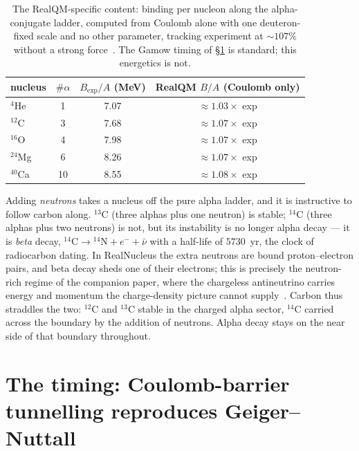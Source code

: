 \documentclass[11pt]{article}
\begin{document}
\begin{table}[h]
\centering
\begin{tabular}{lccc}
\hline
nucleus & $\#\alpha$ & $B_{\exp}/A$ (MeV) & RealQM $B/A$ (Coulomb only) \\
\hline
$^{4}$He  & 1 & 7.07 & $\approx1.03\times$ exp \\
$^{12}$C  & 3 & 7.68 & $\approx1.07\times$ exp \\
$^{16}$O  & 4 & 7.98 & $\approx1.07\times$ exp \\
$^{24}$Mg & 6 & 8.26 & $\approx1.07\times$ exp \\
$^{40}$Ca & 10 & 8.55 & $\approx1.08\times$ exp \\
\hline
\end{tabular}
\caption{The RealQM-specific content: binding per nucleon along the alpha-conjugate ladder, computed from
Coulomb alone with one deuteron-fixed scale and no other parameter, tracking experiment at $\sim107\%$
without a strong force~\cite{RealNucleus}. The Gamow timing of \S\ref{sec:gamow} is standard; this
energetics is not.}
\label{tab:realqm}
\end{table}

Adding \emph{neutrons} takes a nucleus off the pure alpha ladder, and it is instructive to follow carbon
along. $^{13}$C (three alphas plus one neutron) is stable; $^{14}$C (three alphas plus two neutrons) is
not, but its instability is no longer alpha decay --- it is \emph{beta} decay,
$^{14}\mathrm{C}\to{}^{14}\mathrm{N}+e^-+\bar\nu$ with a half-life of $5730$~yr, the clock of radiocarbon
dating. In RealNucleus the extra neutrons are bound proton--electron pairs, and beta decay sheds one of
their electrons; this is precisely the neutron-rich regime of the companion paper, where the chargeless
antineutrino carries energy and momentum the charge-density picture cannot supply~\cite{BetaCompanion}.
Carbon thus straddles the two: $^{12}$C and $^{13}$C stable in the charged alpha sector, $^{14}$C carried
across the boundary by the addition of neutrons. Alpha decay stays on the near side of that boundary
throughout.

\section{The timing: Coulomb-barrier tunnelling reproduces Geiger--Nuttall}
\label{sec:gamow}
\end{document}

